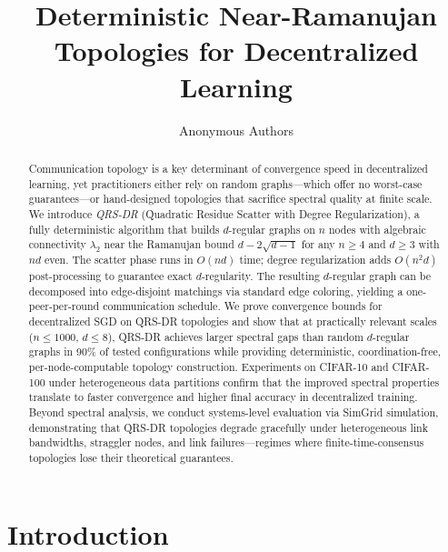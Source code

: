 \documentclass{article}
\title{Deterministic Near-Ramanujan Topologies for Decentralized Learning}
\author{%
  Anonymous Authors
}
\newcommand{\lam}{\lambda_2}
\begin{document}
\maketitle

\begin{abstract}
Communication topology is a key determinant of convergence speed in decentralized
learning, yet practitioners either rely on random graphs---which offer no
worst-case guarantees---or hand-designed topologies that sacrifice spectral
quality at finite scale.  We introduce \emph{QRS-DR} (Quadratic Residue
Scatter with Degree Regularization), a fully deterministic algorithm that
builds $d$-regular graphs on $n$ nodes with algebraic connectivity $\lam$
near the Ramanujan bound $d - 2\sqrt{d-1}$ for any $n \ge 4$ and $d \ge 3$
with $nd$ even.  The scatter phase runs in $O(nd)$ time; degree
regularization adds $O(n^2 d)$ post-processing to guarantee exact
$d$-regularity.
%
The resulting $d$-regular graph can be decomposed into edge-disjoint
matchings via standard edge coloring, yielding a one-peer-per-round
communication schedule.
%
We prove convergence bounds for decentralized SGD on QRS-DR topologies
and show that at practically relevant scales ($n \le 1000$, $d \le 8$),
QRS-DR achieves larger spectral gaps than random $d$-regular graphs in
90\% of tested configurations while providing deterministic,
coordination-free, per-node-computable topology construction.
%
Experiments on CIFAR-10 and CIFAR-100 under heterogeneous data partitions
confirm that the improved spectral properties translate to faster
convergence and higher final accuracy in decentralized training.
%
Beyond spectral analysis, we conduct systems-level evaluation via SimGrid
simulation, demonstrating that QRS-DR topologies degrade gracefully under
heterogeneous link bandwidths, straggler nodes, and link failures---regimes
where finite-time-consensus topologies lose their theoretical guarantees.
\end{abstract}

\section{Introduction}
\label{sec:intro}
\end{document}
